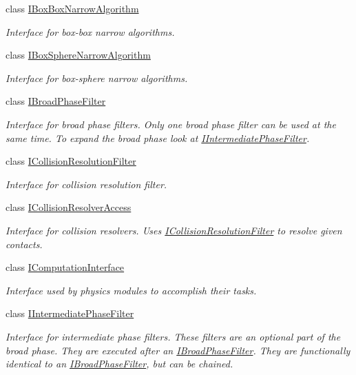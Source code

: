 \begin{DoxyCompactItemize}
class \mbox{\hyperlink{classr3_1_1_i_box_box_narrow_algorithm}{I\+Box\+Box\+Narrow\+Algorithm}}
\begin{DoxyCompactList}\small\item\em Interface for box-\/box narrow algorithms. \end{DoxyCompactList}\item 
class \mbox{\hyperlink{classr3_1_1_i_box_sphere_narrow_algorithm}{I\+Box\+Sphere\+Narrow\+Algorithm}}
\begin{DoxyCompactList}\small\item\em Interface for box-\/sphere narrow algorithms. \end{DoxyCompactList}\item 
class \mbox{\hyperlink{classr3_1_1_i_broad_phase_filter}{I\+Broad\+Phase\+Filter}}
\begin{DoxyCompactList}\small\item\em Interface for broad phase filters. Only one broad phase filter can be used at the same time. To expand the broad phase look at \mbox{\hyperlink{classr3_1_1_i_intermediate_phase_filter}{I\+Intermediate\+Phase\+Filter}}. \end{DoxyCompactList}\item 
class \mbox{\hyperlink{classr3_1_1_i_collision_resolution_filter}{I\+Collision\+Resolution\+Filter}}
\begin{DoxyCompactList}\small\item\em Interface for collision resolution filter. \end{DoxyCompactList}\item 
class \mbox{\hyperlink{classr3_1_1_i_collision_resolver_access}{I\+Collision\+Resolver\+Access}}
\begin{DoxyCompactList}\small\item\em Interface for collision resolvers. Uses \mbox{\hyperlink{classr3_1_1_i_collision_resolution_filter}{I\+Collision\+Resolution\+Filter}} to resolve given contacts. \end{DoxyCompactList}\item 
class \mbox{\hyperlink{classr3_1_1_i_computation_interface}{I\+Computation\+Interface}}
\begin{DoxyCompactList}\small\item\em Interface used by physics modules to accomplish their tasks. \end{DoxyCompactList}\item 
class \mbox{\hyperlink{classr3_1_1_i_intermediate_phase_filter}{I\+Intermediate\+Phase\+Filter}}
\begin{DoxyCompactList}\small\item\em Interface for intermediate phase filters. These filters are an optional part of the broad phase. They are executed after an \mbox{\hyperlink{classr3_1_1_i_broad_phase_filter}{I\+Broad\+Phase\+Filter}}. They are functionally identical to an \mbox{\hyperlink{classr3_1_1_i_broad_phase_filter}{I\+Broad\+Phase\+Filter}}, but can be chained. \end{DoxyCompactList}\item 

\end{DoxyCompactItemize}

